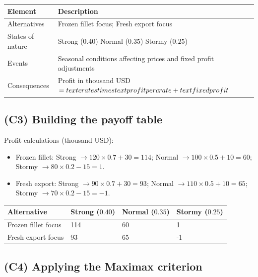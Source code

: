 \documentclass[11pt]{article}
\begin{document}
	\begin{center}
		\begin{tabular}{ll}
			\toprule
			Element & Description \\
			\midrule
			Alternatives & Frozen fillet focus; Fresh export focus \\
			States of nature & Strong
			($0.40$)
			Normal
			($0.35$)
			Stormy
			($0.25$) \\
			Events & Seasonal conditions affecting prices and fixed profit adjustments \\
			Consequences & Profit in thousand USD $= \\text{crates} \\times \\text{profit per crate} + \\text{fixed profit}$ \\
			\bottomrule
		\end{tabular}
	\end{center}
	
	\subsection*{(C3) Building the payoff table}
	
	\hypertarget{problem11-c3}{}
	
	Profit calculations (thousand USD):
	\begin{itemize}
		\item Frozen fillet: Strong $\to 120 \times 0.7 + 30 = 114$; Normal $\to 100 \times 0.5 + 10 = 60$; Stormy $\to 80 \times 0.2 - 15 = 1$.
		\item Fresh export: Strong $\to 90 \times 0.7 + 30 = 93$; Normal $\to 110 \times 0.5 + 10 = 65$; Stormy $\to 70 \times 0.2 - 15 = -1$.
	\end{itemize}
	\begin{center}
		\begin{tabular}{llll}
			\toprule
			Alternative & Strong
			($0.40$) & Normal
			($0.35$) & Stormy
			($0.25$) \\
			\midrule
			Frozen fillet focus & 114 & 60 & 1 \\
			Fresh export focus & 93 & 65 & -1 \\
			\bottomrule
		\end{tabular}
	\end{center}
	
	\subsection*{(C4) Applying the Maximax criterion}
	
\end{document}
